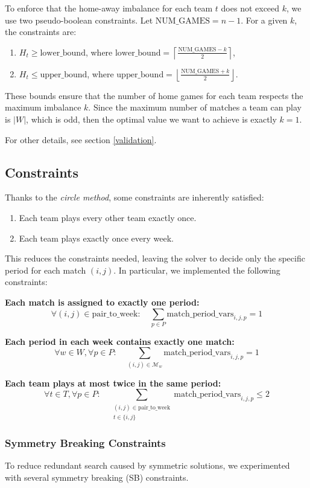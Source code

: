 To enforce that the home-away imbalance for each team $t$ does not exceed $k$, we use two pseudo-boolean constraints. Let $\text{NUM\_GAMES} = n-1$. For a given $k$, the constraints are:
\begin{enumerate}
    \item $H_t \ge \text{lower\_bound}$, where $\text{lower\_bound} = \left\lceil \frac{\text{NUM\_GAMES} - k}{2} \right\rceil$,
    \item $H_t \le \text{upper\_bound}$, where $\text{upper\_bound} = \left\lfloor \frac{\text{NUM\_GAMES} + k}{2} \right\rfloor$.
\end{enumerate}
These bounds ensure that the number of home games for each team respects the maximum imbalance $k$. Since the maximum number of matches a team can play is $|W|$, which is odd, then the optimal value we want to achieve is exactly $k=1$.

For other details, see section \ref{validation}.


\subsection{Constraints}
Thanks to the \emph{circle method}, some constraints are inherently satisfied:
\begin{enumerate}
    \item Each team plays every other team exactly once.
    \item Each team plays exactly once every week.
\end{enumerate}
This reduces the constraints needed, leaving the solver to decide only the specific period for each match $(i,j)$. In particular, we implemented the following constraints:

\textbf{Each match is assigned to exactly one period:}
\[
\forall (i,j) \in \text{pair\_to\_week}: \quad \sum_{p \in P} \text{match\_period\_vars}_{i,j,p} = 1
\]

\textbf{Each period in each week contains exactly one match:}
\[
\forall w \in W, \forall p \in P: \quad \sum_{(i,j) \in \mathcal{M}_w} \text{match\_period\_vars}_{i,j,p} = 1
\]

\textbf{Each team plays at most twice in the same period:}
\[
\forall t \in T, \forall p \in P: \quad \sum_{\substack{(i,j) \in \text{pair\_to\_week} \\ t \in \{i,j\}}} \text{match\_period\_vars}_{i,j,p} \leq 2
\]

\subsubsection*{Symmetry Breaking Constraints}
To reduce redundant search caused by symmetric solutions, we experimented with several symmetry breaking (SB) constraints.

